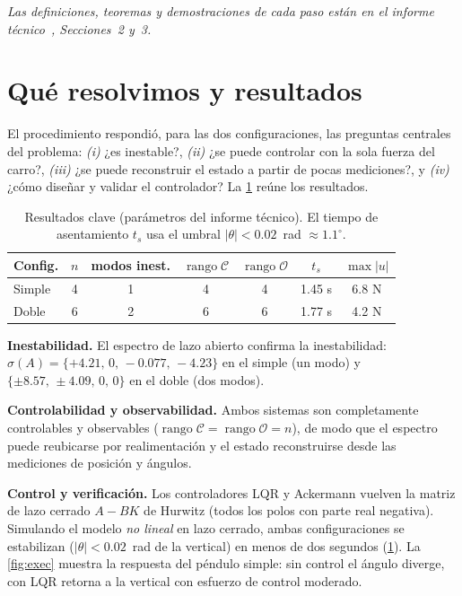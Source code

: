 \documentclass[11pt,letterpaper]{article}
\DeclareMathOperator{\rank}{rango}
\begin{document}
\noindent\emph{Las definiciones, teoremas y demostraciones de cada paso están en
el informe técnico~\cite{tecnico}, Secciones~2 y~3.}

\section{Qué resolvimos y resultados}

El procedimiento respondió, para las dos configuraciones, las preguntas centrales
del problema: \emph{(i)} ¿es inestable?, \emph{(ii)} ¿se puede controlar con la
sola fuerza del carro?, \emph{(iii)} ¿se puede reconstruir el estado a partir de
pocas mediciones?, y \emph{(iv)} ¿cómo diseñar y validar el controlador? La
\cref{tab:exec} reúne los resultados.

\begin{table}[htbp]
  \centering
  \small
  \caption{Resultados clave (parámetros del informe técnico). El tiempo de
  asentamiento $t_s$ usa el umbral $|\theta|<0.02$~rad $\approx1.1^\circ$.}
  \label{tab:exec}
  \begin{tabular}{@{}lcccccc@{}}
    \toprule
    \textbf{Config.} & $n$ & \textbf{modos inest.} & $\rank\mathcal{C}$ & $\rank\mathcal{O}$ & $t_s$ & $\max|u|$\\
    \midrule
    Simple & 4 & 1 & 4 & 4 & 1.45 s & 6.8 N\\
    Doble  & 6 & 2 & 6 & 6 & 1.77 s & 4.2 N\\
    \bottomrule
  \end{tabular}
\end{table}

\textbf{Inestabilidad.} El espectro de lazo abierto confirma la inestabilidad:
$\sigma(A)=\{+4.21,\,0,\,-0.077,\,-4.23\}$ en el simple (un modo) y
$\{\pm8.57,\,\pm4.09,\,0,\,0\}$ en el doble (dos modos).

\textbf{Controlabilidad y observabilidad.} Ambos sistemas son completamente
controlables y observables ($\rank\mathcal{C}=\rank\mathcal{O}=n$), de modo que
el espectro puede reubicarse por realimentación y el estado reconstruirse desde
las mediciones de posición y ángulos.

\textbf{Control y verificación.} Los controladores LQR y Ackermann vuelven la
matriz de lazo cerrado $A-BK$ de Hurwitz (todos los polos con parte real
negativa). Simulando el modelo \emph{no lineal} en lazo cerrado, ambas
configuraciones se estabilizan ($|\theta|<0.02$~rad de la vertical) en menos de
dos segundos (\cref{tab:exec}). La
\cref{fig:exec} muestra la respuesta del péndulo simple: sin control el ángulo
diverge, con LQR retorna a la vertical con esfuerzo de control moderado.
\end{document}
